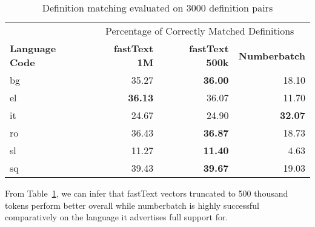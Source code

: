 \begin{table}[htbp]
    \centering
    \begin{tabular}{lrrr}
        \toprule
& \multicolumn{3}{c}{Percentage of Correctly Matched Definitions} \\
\cmidrule(lr){2-4}
        \textbf{Language Code} & \textbf{fastText 1M} & \textbf{fastText 500k} & \textbf{Numberbatch} \\
        \midrule
        bg & 35.27 & \textbf{36.00} & 18.10 \\
        el & \textbf{36.13} & 36.07 & 11.70 \\
        it & 24.67 & 24.90 & \textbf{32.07} \\
        ro & 36.43 & \textbf{36.87} & 18.73 \\
        sl & 11.27 & \textbf{11.40} & 4.63 \\
        sq & 39.43 & \textbf{39.67} & 19.03 \\
        \bottomrule
    \end{tabular}
    \caption{Definition matching evaluated on 3000 definition pairs}%
    \label{tab:lapjv_3000}
\end{table}

From Table~\ref{tab:lapjv_3000}, we can infer that fastText vectors truncated to 500 thousand tokens perform better overall while numberbatch is highly successful comparatively on the language it advertises full support for.


